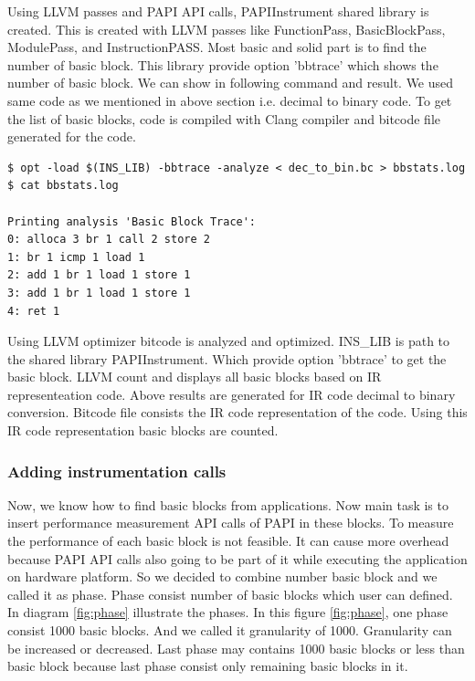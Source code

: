Using LLVM passes and PAPI API calls, PAPIInstrument shared library is created. This is created with LLVM passes like FunctionPass, BasicBlockPass, ModulePass, and InstructionPASS. Most basic and solid part is to find the number of basic block. This library provide option 'bbtrace' which shows the number of basic block. We can show in following command and result. We used same code as we mentioned in above section i.e. decimal to binary code. To get the list of basic blocks, code is compiled with Clang compiler and bitcode file generated for the code.

\begin{lstlisting}
$ opt -load $(INS_LIB) -bbtrace -analyze < dec_to_bin.bc > bbstats.log
$ cat bbstats.log

Printing analysis 'Basic Block Trace':
0: alloca 3 br 1 call 2 store 2 
1: br 1 icmp 1 load 1 
2: add 1 br 1 load 1 store 1 
3: add 1 br 1 load 1 store 1 
4: ret 1 
\end{lstlisting}

Using LLVM optimizer bitcode is analyzed and optimized. INS\_LIB is path to the shared library PAPIInstrument. Which provide option '\-bbtrace' to get the basic block. LLVM count and displays all basic blocks based on IR representeation code. Above results are generated for IR code decimal to binary conversion. Bitcode file consists the IR code representation of the code. Using this IR code representation basic blocks are counted.

\subsubsection{Adding instrumentation calls}
Now, we know how to find basic blocks from applications. Now main task is to insert performance measurement API calls of PAPI in these blocks. To measure the performance of each basic block is not feasible. It can cause more overhead because PAPI API calls also going to be part of it while executing the application on hardware platform. So we decided to combine number basic block and we called it as phase. Phase consist number of basic blocks which user can defined. In diagram \ref{fig:phase} illustrate the phases. In this figure \ref{fig:phase}, one phase consist 1000 basic blocks. And we called it granularity of 1000. Granularity can be increased or decreased. Last phase may contains 1000 basic blocks or less than basic block because last phase consist only remaining basic blocks in it. 

